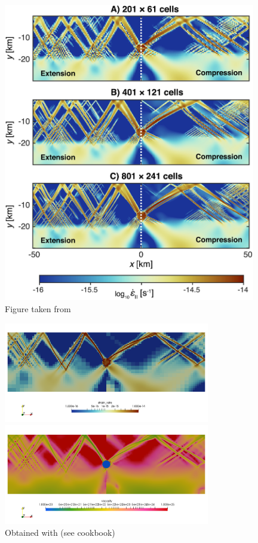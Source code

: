\begin{center}
\includegraphics[width=11cm]{python_codes/fieldstone_70/images/fig2}\\
{\captionfont Figure taken from \cite{dudy20}}
\end{center}

\begin{center}
\includegraphics[width=9cm]{python_codes/fieldstone_70/images/aspect_sr}\\
\includegraphics[width=9cm]{python_codes/fieldstone_70/images/aspect_eta}\\
{\captionfont Obtained with \aspect (see cookbook)}
\end{center}


